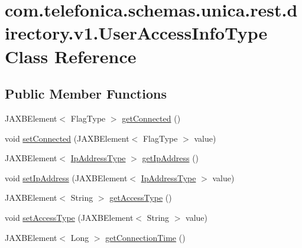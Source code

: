 \hypertarget{classcom_1_1telefonica_1_1schemas_1_1unica_1_1rest_1_1directory_1_1v1_1_1UserAccessInfoType}{
\section{com.telefonica.schemas.unica.rest.directory.v1.UserAccessInfoType Class Reference}
\label{classcom_1_1telefonica_1_1schemas_1_1unica_1_1rest_1_1directory_1_1v1_1_1UserAccessInfoType}
}
\subsection*{Public Member Functions}
\begin{DoxyCompactItemize}
\item 
JAXBElement$<$ FlagType $>$ \hyperlink{classcom_1_1telefonica_1_1schemas_1_1unica_1_1rest_1_1directory_1_1v1_1_1UserAccessInfoType_ae495e006cb4fc1c0fe38c1043dd686f0}{getConnected} ()
\item 
void \hyperlink{classcom_1_1telefonica_1_1schemas_1_1unica_1_1rest_1_1directory_1_1v1_1_1UserAccessInfoType_a00a05f37aebe7b98756e82ab6dcc3cf0}{setConnected} (JAXBElement$<$ FlagType $>$ value)
\item 
JAXBElement$<$ \hyperlink{classcom_1_1telefonica_1_1schemas_1_1unica_1_1rest_1_1common_1_1v1_1_1IpAddressType}{IpAddressType} $>$ \hyperlink{classcom_1_1telefonica_1_1schemas_1_1unica_1_1rest_1_1directory_1_1v1_1_1UserAccessInfoType_a5fc2541424f3a60586971ff173e4b5a5}{getIpAddress} ()
\item 
void \hyperlink{classcom_1_1telefonica_1_1schemas_1_1unica_1_1rest_1_1directory_1_1v1_1_1UserAccessInfoType_a3748809cce9c5b189fa06a85f304319e}{setIpAddress} (JAXBElement$<$ \hyperlink{classcom_1_1telefonica_1_1schemas_1_1unica_1_1rest_1_1common_1_1v1_1_1IpAddressType}{IpAddressType} $>$ value)
\item 
JAXBElement$<$ String $>$ \hyperlink{classcom_1_1telefonica_1_1schemas_1_1unica_1_1rest_1_1directory_1_1v1_1_1UserAccessInfoType_aa0c86fbf0846ed3df846ca60cf7baf4d}{getAccessType} ()
\item 
void \hyperlink{classcom_1_1telefonica_1_1schemas_1_1unica_1_1rest_1_1directory_1_1v1_1_1UserAccessInfoType_a908ee3b4519142d64e7a8401a51977b6}{setAccessType} (JAXBElement$<$ String $>$ value)
\item 
JAXBElement$<$ Long $>$ \hyperlink{classcom_1_1telefonica_1_1schemas_1_1unica_1_1rest_1_1directory_1_1v1_1_1UserAccessInfoType_a0dd7daf7ccdbdab94af90ad3ee7ecd25}{getConnectionTime} ()

\end{DoxyCompactItemize}
